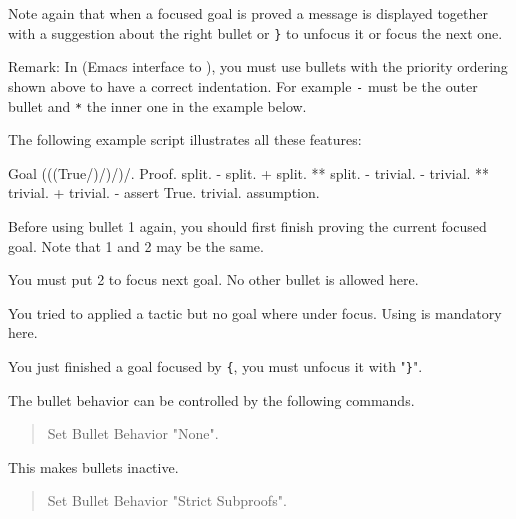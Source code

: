 Note again that when a focused goal is proved a message is displayed
together with a suggestion about the right bullet or {\tt \}} to
unfocus it or focus the next one.

Remark: In {\ProofGeneral} (Emacs interface to {\Coq}), you must use
bullets with the priority ordering shown above to have a correct
indentation. For example {\tt -} must be the outer bullet and {\tt **}
the inner one in the example below.

The following example script illustrates all these features:
\begin{coq_example*}
Goal (((True/\True)/\True)/\True)/\True.
Proof.
  split.
  - split.
    + split.
      ** { split.
          - trivial.
          - trivial.
        }
      ** trivial.
    + trivial.
  - assert True.
    { trivial. }
    assumption.
\end{coq_example*}


\begin{ErrMsgs}
\item {}

  Before using bullet {\abullet}1 again, you should first finish
  proving the current focused goal. Note that {\abullet}1 and
  {\abullet}2 may be the same.

\item {} You must put {\abullet}2 to focus next goal.
  No other bullet is allowed here.


\item {}

  You tried to applied a tactic but no goal where under focus. Using
  {\abullet} is mandatory here.

\item {} You
  just finished a goal focused by {\tt \{}, you must unfocus it with "{\tt \}}".

\end{ErrMsgs}

The bullet behavior can be controlled by the following commands.

\begin{quote}
Set Bullet Behavior "None".
\end{quote}

This makes bullets inactive.

\begin{quote}
Set Bullet Behavior "Strict Subproofs".
\end{quote}

